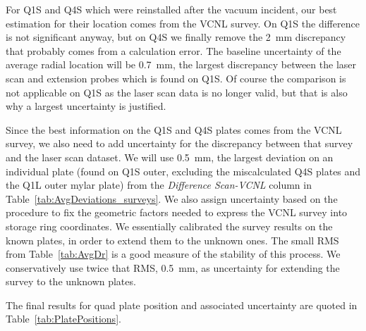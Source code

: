 For Q1S and Q4S which were reinstalled after the vacuum incident, our best estimation for their location comes from the VCNL survey. On Q1S the difference is not significant anyway, but on Q4S we finally remove the \SI{2}{mm} discrepancy that probably comes from a calculation error.
The baseline uncertainty of the average radial location will be \SI{0.7}{mm}, the largest discrepancy between the laser scan and extension probes which is found on Q1S. Of course the comparison is not applicable on Q1S as the laser scan data is no longer valid, but that is also why a largest uncertainty is justified.



Since the best information on the Q1S and Q4S plates comes from the VCNL survey, we also need to add uncertainty for the discrepancy between that survey and the laser scan dataset.
We will use \SI{0.5}{mm}, the largest deviation on an individual plate (found on Q1S outer, excluding the miscalculated Q4S plates and the Q1L outer mylar plate) from the \textit{Difference Scan-VCNL} column in Table~\ref{tab:AvgDeviations_surveys}.
We also assign uncertainty based on the procedure to fix the geometric factors needed to express the VCNL survey into storage ring coordinates. We essentially calibrated the survey results on the known plates, in order to extend them to the unknown ones.
The small RMS from Table~\ref{tab:AvgDr} is a good measure of the stability of this process. We conservatively use twice that RMS, \SI{0.5}{mm}, as uncertainty for extending the survey to the unknown plates.


The final results for quad plate position and associated uncertainty are quoted in Table~\ref{tab:PlatePositions}.









